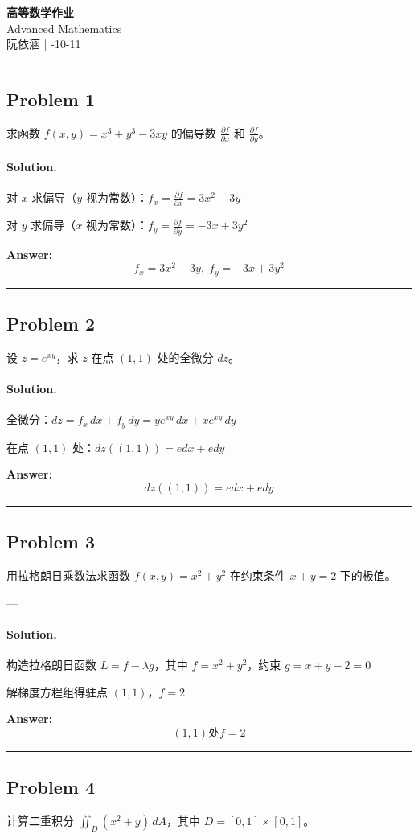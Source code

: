 \documentclass[12pt, a4paper]{article}
\newcommand{\problem}[1]{\subsection*{Problem #1}}
\newcommand{\solution}{\paragraph{Solution.}}
\begin{document}
\begin{center}
    {\LARGE\bfseries 高等数学作业} \\[0.5em]
    {\large Advanced Mathematics} \\[0.3em]
    阮依涵 \quad | -10-11
\end{center}

\hrule
\vspace{1em}
\problem{1}

求函数 $f(x,y)=x^3+y^3-3xy$ 的偏导数 $\frac{\partial f}{\partial x}$ 和 $\frac{\partial f}{\partial y}$。

\solution

对 $x$ 求偏导（$y$ 视为常数）：$f_x=\frac{\partial f}{\partial x}=3 x^{2} - 3 y$

对 $y$ 求偏导（$x$ 视为常数）：$f_y=\frac{\partial f}{\partial y}=- 3 x + 3 y^{2}$

\textbf{Answer:}
\[\boxed{f_x=3 x^{2} - 3 y,\; f_y=- 3 x + 3 y^{2}}\]

\vspace{1em}
\hrule
\vspace{1em}

\problem{2}

设 $z=e^{xy}$，求 $z$ 在点 $(1,1)$ 处的全微分 $dz$。

\solution

全微分：$dz = f_x\,dx + f_y\,dy = y e^{x y}\,dx + x e^{x y}\,dy$

在点 $(1, 1)$ 处：$dz((1, 1)) = e dx + e dy$

\textbf{Answer:}
\[\boxed{dz((1, 1)) = e dx + e dy}\]

\vspace{1em}
\hrule
\vspace{1em}

\problem{3}

用拉格朗日乘数法求函数 $f(x,y)=x^2+y^2$ 在约束条件 $x+y=2$ 下的极值。

---

\solution

构造拉格朗日函数 $L=f-\lambda g$，其中 $f=x^{2} + y^{2}$，约束 $g=x + y - 2=0$

解梯度方程组得驻点 $(1,1)$，$f=2$

\textbf{Answer:}
\[\boxed{(1,1) 处 f=2}\]

\vspace{1em}
\hrule
\vspace{1em}

\problem{4}

计算二重积分 $\iint_D (x^2+y)\,dA$，其中 $D=[0,1]\times[0,1]$。
\end{document}
